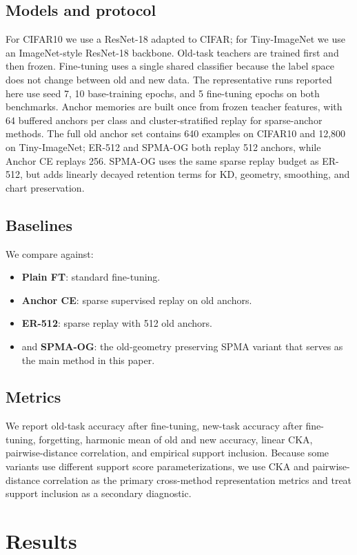 \documentclass[11pt]{article}
\newcommand{\method}{\textsc{SPMA-OG}}
\begin{document}
\subsection{Models and protocol}
For CIFAR10 we use a ResNet-18 adapted to CIFAR; for Tiny-ImageNet we use an ImageNet-style ResNet-18 backbone. Old-task teachers are trained first and then frozen. Fine-tuning uses a single shared classifier because the label space does not change between old and new data. The representative runs reported here use seed 7, 10 base-training epochs, and 5 fine-tuning epochs on both benchmarks. Anchor memories are built once from frozen teacher features, with 64 buffered anchors per class and cluster-stratified replay for sparse-anchor methods. The full old anchor set contains 640 examples on CIFAR10 and 12{,}800 on Tiny-ImageNet; ER-512 and \method{} both replay 512 anchors, while Anchor CE replays 256. \method{} uses the same sparse replay budget as ER-512, but adds linearly decayed retention terms for KD, geometry, smoothing, and chart preservation.

\subsection{Baselines}
We compare against:
\begin{itemize}[leftmargin=1.25em]
  \item \textbf{Plain FT}: standard fine-tuning.
  \item \textbf{Anchor CE}: sparse supervised replay on old anchors.
  \item \textbf{ER-512}: sparse replay with 512 old anchors.
  \item and \textbf{SPMA-OG}: the old-geometry preserving SPMA variant that serves as the main method in this paper.
\end{itemize}

\subsection{Metrics}
We report old-task accuracy after fine-tuning, new-task accuracy after fine-tuning, forgetting, harmonic mean of old and new accuracy, linear CKA, pairwise-distance correlation, and empirical support inclusion. Because some variants use different support score parameterizations, we use CKA and pairwise-distance correlation as the primary cross-method representation metrics and treat support inclusion as a secondary diagnostic.

\section{Results}
\end{document}
